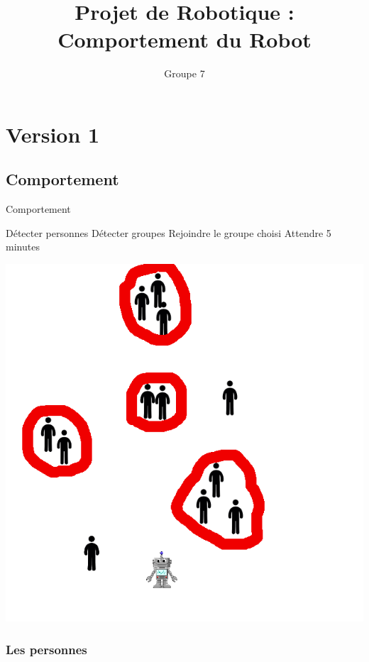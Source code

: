 \documentclass{report}
\title{Projet de Robotique : Comportement du Robot}
\author{Groupe 7}
\begin{document}
\maketitle

\chapter{Version 1}

\section{Comportement}
\begin{algorithm}
\caption{Comportement}
\begin{algorithmic}
\STATE D\'etecter personnes
\STATE D\'etecter groupes
\STATE Rejoindre le groupe choisi
\STATE Attendre 5 minutes
\ENDWHILE
\end{algorithmic}
\end{algorithm}

\begin{center}
\includegraphics[scale=0.6]{v1_action_robot.png}
\end{center}
\subsection{Les personnes}
\end{document}
